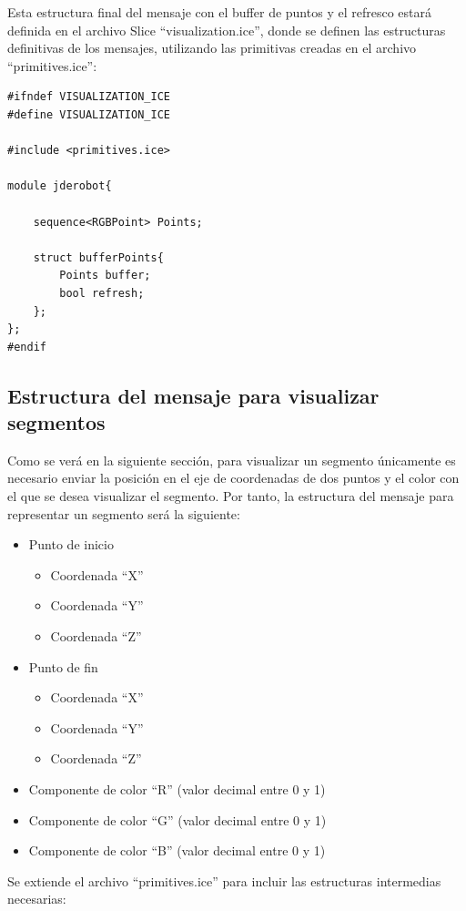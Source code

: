 Esta estructura final del mensaje con el buffer de puntos y el refresco estará definida en el archivo Slice ``visualization.ice'', donde se definen las estructuras definitivas de los mensajes, utilizando las primitivas creadas en el archivo ``primitives.ice'':

\begin{lstlisting}[frame=single]
#ifndef VISUALIZATION_ICE
#define VISUALIZATION_ICE

#include <primitives.ice>

module jderobot{

	sequence<RGBPoint> Points;

	struct bufferPoints{
		Points buffer;
		bool refresh;
	};
};
#endif
\end{lstlisting}


\subsection{Estructura del mensaje para visualizar segmentos}
Como se verá en la siguiente sección, para visualizar un segmento únicamente es necesario enviar la posición en el eje de coordenadas de dos puntos y el color con el que se desea visualizar el segmento. Por tanto, la estructura del mensaje para representar un segmento será la siguiente:
\begin{itemize}
\item Punto de inicio
	\begin{itemize}
		\item Coordenada ``X''
		\item Coordenada ``Y''
		\item Coordenada ``Z''
	\end{itemize}
\item Punto de fin
	\begin{itemize}
		\item Coordenada ``X''
		\item Coordenada ``Y''
		\item Coordenada ``Z''
	\end{itemize}
\item Componente de color ``R'' (valor decimal entre 0 y 1)
\item Componente de color ``G'' (valor decimal entre 0 y 1)
\item Componente de color ``B'' (valor decimal entre 0 y 1)
\end{itemize}

Se extiende el archivo ``primitives.ice'' para incluir las estructuras intermedias necesarias:


